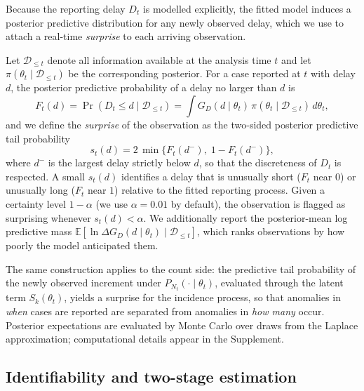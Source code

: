 \documentclass[12pt]{article}
\begin{document}
{\color{red}
Because the reporting delay $D_t$ is modelled explicitly, the fitted model induces a posterior predictive distribution for any newly observed delay, which we use to attach a real-time \emph{surprise} to each arriving observation.

Let $\mathcal{D}_{\le t}$ denote all information available at the analysis time $t$ and let $\pi(\theta_t \mid \mathcal{D}_{\le t})$ be the corresponding posterior. For a case reported at $t$ with delay $d$, the posterior predictive probability of a delay no larger than $d$ is
\begin{equation}
  F_t(d) = \Pr(D_t \le d \mid \mathcal{D}_{\le t}) = \int G_D(d \mid \theta_t)\, \pi(\theta_t \mid \mathcal{D}_{\le t})\, d\theta_t,
\end{equation}
and we define the \emph{surprise} of the observation as the two-sided posterior predictive tail probability
\begin{equation}\label{eq:surprise}
  s_t(d) = 2\,\min\bigl\{F_t(d^-),\; 1 - F_t(d^-)\bigr\},
\end{equation}
where $d^-$ is the largest delay strictly below $d$, so that the discreteness of $D_t$ is respected. A small $s_t(d)$ identifies a delay that is unusually short ($F_t$ near $0$) or unusually long ($F_t$ near $1$) relative to the fitted reporting process. Given a certainty level $1-\alpha$ (we use $\alpha = 0.01$ by default), the observation is flagged as surprising whenever $s_t(d) < \alpha$. We additionally report the posterior-mean log predictive mass $\mathbb{E}\!\left[\ln \Delta G_D(d \mid \theta_t) \mid \mathcal{D}_{\le t}\right]$, which ranks observations by how poorly the model anticipated them.

The same construction applies to the count side: the predictive tail probability of the newly observed increment under $P_{N_t}(\cdot \mid \theta_t)$, evaluated through the latent term $S_k(\theta_t)$, yields a surprise for the incidence process, so that anomalies in \emph{when} cases are reported are separated from anomalies in \emph{how many} occur. Posterior expectations are evaluated by Monte Carlo over draws from the Laplace approximation; computational details appear in the Supplement.
}

\subsection{\color{red} Identifiability and two-stage estimation}
\end{document}
